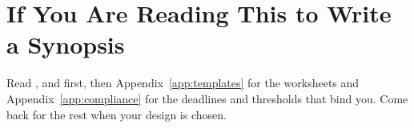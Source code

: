 \section*{If You Are Reading This to Write a Synopsis}

Read ,  and  first, then
Appendix~\ref{app:templates} for the worksheets and
Appendix~\ref{app:compliance} for the deadlines and thresholds that bind you.
Come back for the rest when your design is chosen.

\clearpage
\tableofcontents
\clearpage
